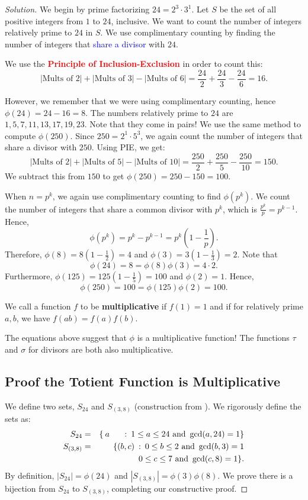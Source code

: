 \begin{proof}[Solution] We begin by prime factorizing $24=2^3\cdot 3^1$. Let $S$ be the set of all positive integers from $1$ to $24$, inclusive. We want to count the number of integers relatively prime to $24$ in $S$. We use complimentary counting by finding the number of integers that \textcolor{blue}{share a divisor} with $24$.
	
We use the \textbf{\textcolor{red}{Principle of Inclusion-Exclusion}} in order to count this: $$\left|\text{Mults of 2}\right|+\left|\text{Mults of 3}\right|-\left|\text{Mults of 6}\right|=\frac{24}{2}+\frac{24}{3}-\frac{24}{6}=16.$$

However, we remember that we were using complimentary counting, hence $\phi(24)=24-16=8$. The numbers relatively prime to $24$ are $1, 5, 7, 11, 13, 17, 19, 23$. Note that they come in pairs!
\clearpage
We use the same method to compute $\phi(250)$. Since $250=2^1\cdot 5^3$, we again count the number of integers that share a divisor with $250$. Using PIE, we get: $$\left|\text{Mults of 2}\right|+\left|\text{Mults of 5}\right|-\left|\text{Mults of 10}\right|=\frac{250}{2}+\frac{250}{5}-\frac{250}{10}=150.$$
We subtract this from $150$ to get $\phi(250)=250-150=100$. 

When $n=p^k$, we again use complimentary counting to find $\phi(p^k)$. We count the number of integers that share a common divisor with $p^k$, which is $\displaystyle \frac{p^k}{p}=p^{k-1}.$ Hence, $$\phi(p^k)=p^k-p^{k-1}=p^k\left(1-\frac{1}{p}\right).$$ 
Therefore, $\phi(8)=8\left(1-\frac12\right)=4$ and $\phi(3)=3\left(1-\frac13\right)=2$. Note that $$\phi(24)=8=\phi(8)\phi(3)=4\cdot 2.$$Furthermore, $\phi(125)=125\left(1-\frac15\right)=100$ and $\phi(2)=1$. Hence, $$\phi(250)=100=\phi(125)\phi(2)=100.$$ 

\begin{defi} We call a function $f$ to be \textbf{multiplicative} if $f(1)=1$ and if for relatively prime $a,b$, we have $f(ab)=f(a)f(b)$. \end{defi}

The equations above suggest that $\phi$ is a multiplicative function! The functions $\tau$ and $\sigma$ for divisors are both also multiplicative.
\clearpage

\subsection{Proof the Totient Function is Multiplicative}
We define two sets, $S_{24}$ and $S_{(3,8)}$ (construction from \cite{ox:1}). We rigorously define the sets  as: \begin{eqnarray*}S_{24}&=&\{\:a\;\;\;\;\;\, : \: 1\le a\le 24 \text{ and } \gcd(a, 24)=1\} \\ S_{(3,8)}&=&\{(b,c)\: : \: 0\le b\le 2 \text { and } \gcd(b, 3)=1 \\ && \text{\color{white}nice latex\color{black}} 0\le c\le 7 \text { and } \gcd(c,8)=1 \}. \end{eqnarray*}
By definition, $|S_{24}|=\phi(24)$ and $|S_{(3,8)}|=\phi(3)\phi(8)$. We prove there is a bijection from $S_{24}$ to $S_{(3,8)}$, completing our constructive proof.


\end{proof}
